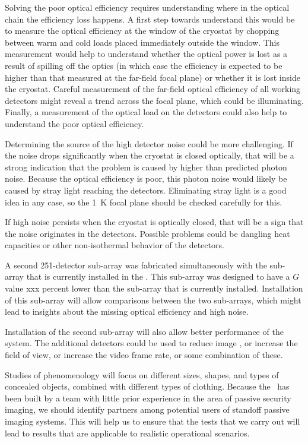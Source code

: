 Solving the poor optical efficiency requires understanding where in the optical chain the efficiency loss happens.
A first step towards understand this would be to measure the optical efficiency at the window of the cryostat by chopping between warm and cold loads placed immediately outside the window.
This measurement would help to understand whether the optical power is lost as a result of spilling off the optics (in which case the efficiency is expected to be higher than that measured at the far-field focal plane) or whether it is lost inside the cryostat.
Careful measurement of the far-field optical efficiency of all working detectors might reveal a trend across the focal plane, which could be illuminating.
Finally, a measurement of the optical load on the detectors could also help to understand the poor optical efficiency.

Determining the source of the high detector noise could be more challenging.
If the noise drops significantly when the cryostat is closed optically, that will be a strong indication that the problem is caused by higher than predicted photon noise.
Because the optical efficiency is poor, this photon noise would likely be caused by stray light reaching the detectors.
Eliminating stray light is a good idea in any case, so the \SI{1}{\K} focal plane should be checked carefully for this.

If high noise persists when the cryostat is optically closed, that will be a sign that the noise originates in the detectors.
Possible problems could be dangling heat capacities or other non-isothermal behavior of the detectors.

A second 251-detector sub-array was fabricated simultaneously with the sub-array that is currently installed in the \Imager.
This sub-array was designed to have a $G$ value xxx percent lower than the sub-array that is currently installed.
Installation of this sub-array will allow comparisons between the two sub-arrays, which might lead to insights about the missing optical efficiency and high noise.

Installation of the second sub-array will also allow better performance of the system.
The additional detectors could be used to reduce image \NETD, or increase the field of view, or increase the video frame rate, or some combination of these.

Studies of phenomenology will focus on different sizes, shapes, and types of concealed objects, combined with different types of clothing.
Because the \Imager\ has been built by a team with little prior experience in the area of passive security imaging, we should identify partners among potential users of standoff passive imaging systems.
This will help us to ensure that the tests that we carry out will lead to results that are applicable to realistic operational scenarios.

